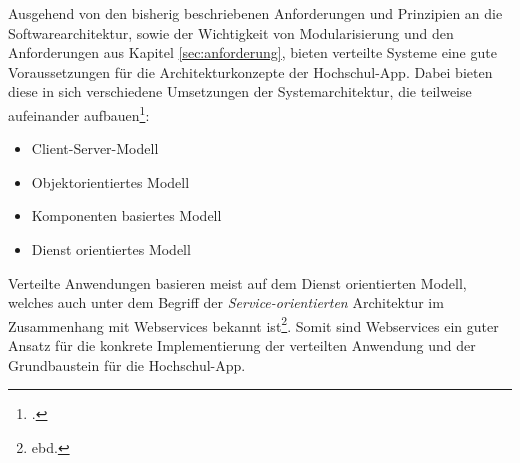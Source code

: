 Ausgehend von den bisherig beschriebenen Anforderungen und Prinzipien an die Softwarearchitektur, sowie der Wichtigkeit von Modularisierung und den Anforderungen aus Kapitel \ref{sec:anforderung}, bieten verteilte Systeme eine gute Voraussetzungen für die Architekturkonzepte der Hochschul-\ac{App}. Dabei bieten diese in sich verschiedene Umsetzungen der Systemarchitektur, die teilweise aufeinander aufbauen\footcite[Vgl.][13\psq]{verteiltesys}:
\begin{itemize}
\item Client-Server-Modell
\item Objektorientiertes Modell
\item Komponenten basiertes Modell
\item Dienst orientiertes Modell
\end{itemize}
Verteilte Anwendungen basieren meist auf dem Dienst orientierten Modell, welches auch unter dem Begriff der \textit{Service-orientierten} Architektur im Zusammenhang mit Webservices bekannt ist\footnote{ebd.}.
Somit sind Webservices ein guter Ansatz für die konkrete Implementierung der verteilten Anwendung und der Grundbaustein für die Hochschul-\ac{App}.
